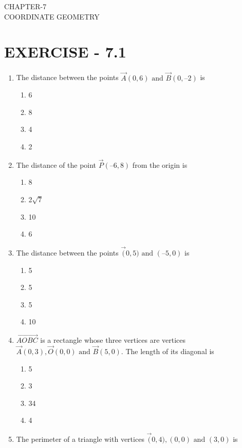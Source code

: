 \documentclass[12pt]{article}
\begin{document}
\begin{center}
\textbf\large{CHAPTER-7 \\ COORDINATE GEOMETRY}
\end{center}

\section{EXERCISE - 7.1}
\fi
\begin{enumerate}[label=\thesection.\arabic*,ref=\thesection.\theenumi]
\item The distance between the points $\vec{A}(0, 6) \text{ and } \vec{B}(0, –2)$ is
	\begin{enumerate}
\item 6
\item 8
\item 4	
\item 2
	\end{enumerate}
\item The distance of the point $\vec{P} (–6, 8)$ from the origin is
\begin{enumerate}

\item 8
\item 2$\sqrt{7}$ 
\item 10
\item 6
\end{enumerate}
\item The distance between the points $\vec(0, 5)\text{ and }(–5, 0)$ is
\begin{enumerate}

\item 5
\item 5
\item 5
\item 10
\end{enumerate}
\item $\vec{AOBC}$ is a rectangle whose three vertices are vertices $\vec{A} (0, 3), \vec{O}(0, 0)\text{ and }
	\vec{B} (5, 0)$. The length of its diagonal is
\begin{enumerate}
\item 5
\item3
\item 34
\item 4
\end{enumerate}
\item The perimeter of a triangle with vertices $\vec(0, 4), (0, 0) \text{ and } (3, 0)$ is
\begin{enumerate}


\end{enumerate}
\end{enumerate}
\end{document}
